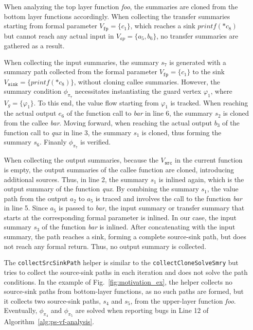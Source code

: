 \begin{example}
    When analyzing the top layer function \textit{foo}, the summaries are cloned from the bottom layer functions accordingly.
    When collecting the transfer summaries starting from formal parameter $V_{\texttt{fp}} = \{ c_1 \}$, which reaches a sink $printf(*c_8)$ but cannot reach any actual input in $V_{ap} = \{ a_{5}, b_{6} \}$, no transfer summaries are gathered as a result.

    When collecting the input summaries, the summary $s_{7}$ is generated with a summary path collected from the formal parameter $V_{\texttt{fp}} = \{c_1\}$ to the sink $V_{\texttt{sink}} = \{printf(*c_8)\}$, without cloning callee summaries. 
    However, the summary condition $\phi_{\pi_7}$ necessitates instantiating the guard vertex $\varphi_{1}$, where $V_{g} = \{\varphi_{1}\}$.
    To this end, the value flow starting from $\varphi_{1}$ is tracked. 
    When reaching the actual output $e_6$ of the function call to \textit{bar} in line 6, the summary $s_{2}$ is cloned from the callee \textit{bar}. 
    Moving forward, when reaching the actual output $b_3$ of the function call to \textit{qux} in line 3, the summary $s_{1}$ is cloned, thus forming the summary $s_{6}$.
    Finanly $\phi_{\pi_7}$ is verified.

    When collecting the output summaries, because the $V_{\texttt{src}}$ in the current function is empty, the output summaries of the callee function are cloned, introducing additional sources. 
    Thus, in line 2, the summary $s_{1}$ is inlined again, which is the output summary of the function \textit{qux}.
    By combining the summary $s_{1}$, the value path from the output $a_2$ to $a_5$ is traced and involves the call to the function \textit{bar} in line 5. 
    Since $a_5$ is passed to \textit{bar}, the input summary or transfer summary that starts at the corresponding formal parameter is inlined. 
    In our case, the input summary $s_{3}$ of the function \textit{bar} is inlined. 
    After concatenating with the input summary, the path reaches a sink, forming a complete source-sink path, but does not reach any formal return. Thus, no output summary is collected.
    
\end{example}


The \texttt{collectSrcSinkPath} helper is similar to the \texttt{collectCloneSolveSmry} but tries to collect the source-sink paths in each iteration and does not solve the path conditions. 
In the example of Fig.~\ref{fig:motivation_ex}, the helper collects no source-sink paths from bottom-layer functions, as no such paths are formed, but it collects two source-sink paths, $s_4$ and $s_5$, from the upper-layer function \textit{foo}.
Eventually, $\phi_{\pi_4}$ and $\phi_{\pi_5}$ are solved when reporting bugs in Line 12 of Algorithm~\ref{alg:ps-vf-analysis}.


